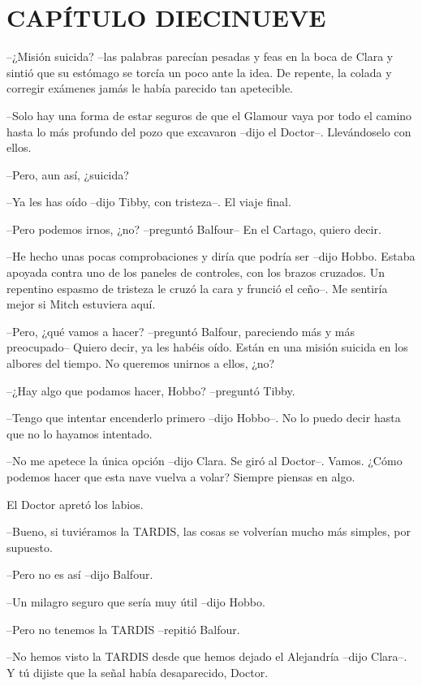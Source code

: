 \chapter*{CAPÍTULO DIECINUEVE}

{--¿Misión suicida? --las palabras parecían pesadas y feas en la boca de
 Clara y sintió que su estómago se torcía un poco ante la idea. De
 repente, la colada y corregir exámenes jamás le había parecido tan
apetecible.}

{--Solo hay una forma de estar seguros de que el Glamour vaya por todo el
 camino hasta lo más profundo del pozo que excavaron --dijo el Doctor--.
Llevándoselo con ellos.}

{--Pero, aun así, ¿suicida?}

{--Ya les has oído --dijo Tibby, con tristeza--. El viaje final.}

{--Pero podemos irnos, ¿no? --preguntó Balfour-- En el Cartago, quiero
decir.}

{--He hecho unas pocas comprobaciones y diría que podría ser --dijo
 Hobbo. Estaba apoyada contra uno de los paneles de controles, con los
 brazos cruzados. Un repentino espasmo de tristeza le cruzó la cara y
frunció el ceño--. Me sentiría mejor si Mitch estuviera aquí.}

{--Pero, ¿qué vamos a hacer? --preguntó Balfour, pareciendo más y más
 preocupado-- Quiero decir, ya les habéis oído. Están en una misión
suicida en los albores del tiempo. No queremos unirnos a ellos, ¿no?}

{--¿Hay algo que podamos hacer, Hobbo? --preguntó Tibby.}

{--Tengo que intentar encenderlo primero --dijo Hobbo--. No lo puedo
decir hasta que no lo hayamos intentado.}

{--No me apetece la única opción --dijo Clara. Se giró al Doctor--.
 Vamos. ¿Cómo podemos hacer que esta nave vuelva a volar? Siempre piensas
en algo.}

{El Doctor apretó los labios.}

{--Bueno, si tuviéramos la TARDIS, las cosas se volverían mucho más
simples, por supuesto.}

{--Pero no es así --dijo Balfour.}

{--Un milagro seguro que sería muy útil --dijo Hobbo.}

{--Pero no tenemos la TARDIS --repitió Balfour.}

{--No hemos visto la TARDIS desde que hemos dejado el Alejandría --dijo
Clara--. Y tú dijiste que la señal había desaparecido, Doctor.}

